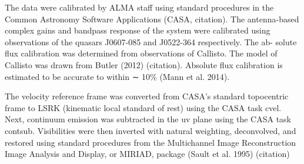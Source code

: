 The data were calibrated by ALMA staff using standard procedures in the Common Astronomy Software Applications (CASA, citation). The antenna-based complex gains and bandpass response of the system were calibrated using observations of the quasars J0607-085 and J0522-364 respectively. The ab- solute flux calibration was determined from observations of Callisto. The model of Callisto was drawn from Butler (2012) (citation). Absolute flux calibration is estimated to be accurate to within ∼ 10\% (Mann et al. 2014).

The velocity reference frame was converted from CASA's standard topocentric frame to LSRK (kinematic local standard of rest) using the CASA task cvel. Next, continuum emission was subtracted in the uv plane using the CASA task contsub. Visibilities were then inverted with natural weighting, deconvolved, and restored using standard procedures from the Multichannel Image Reconstruction Image Analysis and Display, or MIRIAD, package (Sault et al. 1995) (citation)








\iffalse
Things to get:
* noise profiles as func of baseline
* Noise levels
* Beam size, max angular scales after baseline cuts (how to get that?)
* Beam position angle
* Does ICR use natural weighting? (using robust=2)
\fi
